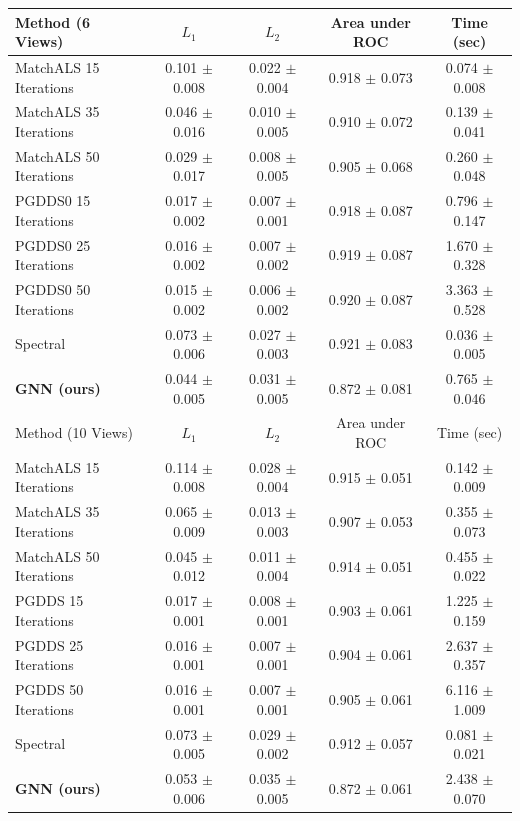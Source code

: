 \documentclass{article} %
\begin{document}
\begin{table}[t]
\begin{center}
\begin{tabular}{|l|c|c|c|c|}
\hline
Method (6 Views)       & $L_1$             & $L_2$             & Area under ROC    & Time (sec)        \\
\hline\hline
MatchALS 15 Iterations & 0.101 $\pm$ 0.008 & 0.022 $\pm$ 0.004 & 0.918 $\pm$ 0.073 & 0.074 $\pm$ 0.008 \\ \hline
MatchALS 35 Iterations & 0.046 $\pm$ 0.016 & 0.010 $\pm$ 0.005 & 0.910 $\pm$ 0.072 & 0.139 $\pm$ 0.041 \\ \hline
MatchALS 50 Iterations & 0.029 $\pm$ 0.017 & 0.008 $\pm$ 0.005 & 0.905 $\pm$ 0.068 & 0.260 $\pm$ 0.048 \\ \hline
PGDDS0 15 Iterations   & 0.017 $\pm$ 0.002 & 0.007 $\pm$ 0.001 & 0.918 $\pm$ 0.087 & 0.796 $\pm$ 0.147 \\ \hline
PGDDS0 25 Iterations   & 0.016 $\pm$ 0.002 & 0.007 $\pm$ 0.002 & 0.919 $\pm$ 0.087 & 1.670 $\pm$ 0.328 \\ \hline
PGDDS0 50 Iterations   & 0.015 $\pm$ 0.002 & 0.006 $\pm$ 0.002 & 0.920 $\pm$ 0.087 & 3.363 $\pm$ 0.528 \\ \hline
Spectral               & 0.073 $\pm$ 0.006 & 0.027 $\pm$ 0.003 & 0.921 $\pm$ 0.083 & 0.036 $\pm$ 0.005 \\ \hline
\textbf{GNN (ours)}    & 0.044 $\pm$ 0.005 & 0.031 $\pm$ 0.005 & 0.872 $\pm$ 0.081 & 0.765 $\pm$ 0.046 \\ \hline

\hline\hline
Method (10 Views)      & $L_1$             & $L_2$             & Area under ROC    & Time (sec)        \\
\hline\hline
MatchALS 15 Iterations & 0.114 $\pm$ 0.008 & 0.028 $\pm$ 0.004 & 0.915 $\pm$ 0.051 & 0.142 $\pm$ 0.009 \\ \hline
MatchALS 35 Iterations & 0.065 $\pm$ 0.009 & 0.013 $\pm$ 0.003 & 0.907 $\pm$ 0.053 & 0.355 $\pm$ 0.073 \\ \hline
MatchALS 50 Iterations & 0.045 $\pm$ 0.012 & 0.011 $\pm$ 0.004 & 0.914 $\pm$ 0.051 & 0.455 $\pm$ 0.022 \\ \hline
PGDDS 15 Iterations    & 0.017 $\pm$ 0.001 & 0.008 $\pm$ 0.001 & 0.903 $\pm$ 0.061 & 1.225 $\pm$ 0.159 \\ \hline
PGDDS 25 Iterations    & 0.016 $\pm$ 0.001 & 0.007 $\pm$ 0.001 & 0.904 $\pm$ 0.061 & 2.637 $\pm$ 0.357 \\ \hline
PGDDS 50 Iterations    & 0.016 $\pm$ 0.001 & 0.007 $\pm$ 0.001 & 0.905 $\pm$ 0.061 & 6.116 $\pm$ 1.009 \\ \hline
Spectral               & 0.073 $\pm$ 0.005 & 0.029 $\pm$ 0.002 & 0.912 $\pm$ 0.057 & 0.081 $\pm$ 0.021 \\ \hline
\textbf{GNN (ours)}    & 0.053 $\pm$ 0.006 & 0.035 $\pm$ 0.005 & 0.872 $\pm$ 0.061 & 2.438 $\pm$ 0.070 \\ \hline


\end{tabular}
\end{center}
\end{table}
\end{document}
